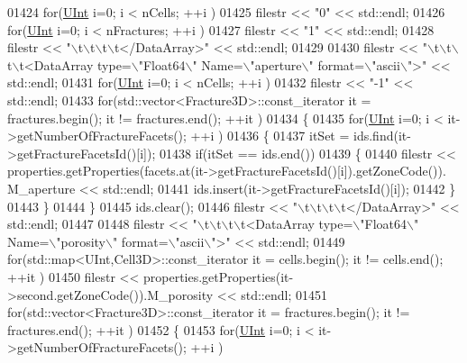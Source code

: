 \begin{DoxyCode}
01424     \textcolor{keywordflow}{for}(\hyperlink{namespaceFVCode3D_a4bf7e328c75d0fd504050d040ebe9eda}{UInt} i=0; i < nCells; ++i )
01425         filestr << \textcolor{stringliteral}{"0"} << std::endl;
01426     \textcolor{keywordflow}{for}(\hyperlink{namespaceFVCode3D_a4bf7e328c75d0fd504050d040ebe9eda}{UInt} i=0; i < nFractures; ++i )
01427         filestr << \textcolor{stringliteral}{"1"} << std::endl;
01428     filestr << \textcolor{stringliteral}{"\(\backslash\)t\(\backslash\)t\(\backslash\)t\(\backslash\)t</DataArray>"} << std::endl;
01429 
01430     filestr << \textcolor{stringliteral}{"\(\backslash\)t\(\backslash\)t\(\backslash\)t\(\backslash\)t<DataArray type=\(\backslash\)"Float64\(\backslash\)" Name=\(\backslash\)"aperture\(\backslash\)" format=\(\backslash\)"ascii\(\backslash\)">"} << std::endl;
01431     \textcolor{keywordflow}{for}(\hyperlink{namespaceFVCode3D_a4bf7e328c75d0fd504050d040ebe9eda}{UInt} i=0; i < nCells; ++i )
01432         filestr << \textcolor{stringliteral}{"-1"} << std::endl;
01433     \textcolor{keywordflow}{for}(std::vector<Fracture3D>::const\_iterator it = fractures.begin(); it != fractures.end(); ++it )
01434     \{
01435         \textcolor{keywordflow}{for}(\hyperlink{namespaceFVCode3D_a4bf7e328c75d0fd504050d040ebe9eda}{UInt} i=0; i < it->getNumberOfFractureFacets(); ++i )
01436         \{
01437             itSet = ids.find(it->getFractureFacetsId()[i]);
01438             \textcolor{keywordflow}{if}(itSet == ids.end())
01439             \{
01440                 filestr << properties.getProperties(facets.at(it->getFractureFacetsId()[i]).getZoneCode()).
      M\_aperture << std::endl;
01441                 ids.insert(it->getFractureFacetsId()[i]);
01442             \}
01443         \}
01444     \}
01445     ids.clear();
01446     filestr << \textcolor{stringliteral}{"\(\backslash\)t\(\backslash\)t\(\backslash\)t\(\backslash\)t</DataArray>"} << std::endl;
01447 
01448     filestr << \textcolor{stringliteral}{"\(\backslash\)t\(\backslash\)t\(\backslash\)t\(\backslash\)t<DataArray type=\(\backslash\)"Float64\(\backslash\)" Name=\(\backslash\)"porosity\(\backslash\)" format=\(\backslash\)"ascii\(\backslash\)">"} << std::endl;
01449     \textcolor{keywordflow}{for}(std::map<UInt,Cell3D>::const\_iterator it = cells.begin(); it != cells.end(); ++it )
01450         filestr << properties.getProperties(it->second.getZoneCode()).M\_porosity << std::endl;
01451     \textcolor{keywordflow}{for}(std::vector<Fracture3D>::const\_iterator it = fractures.begin(); it != fractures.end(); ++it )
01452     \{
01453         \textcolor{keywordflow}{for}(\hyperlink{namespaceFVCode3D_a4bf7e328c75d0fd504050d040ebe9eda}{UInt} i=0; i < it->getNumberOfFractureFacets(); ++i )

\end{DoxyCode}
